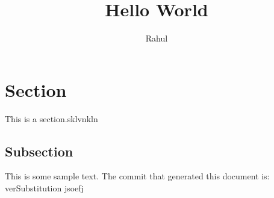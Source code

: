 \documentclass[12pt]{article}
\title{Hello World}
\author{Rahul}
\begin{document}
\maketitle

\section{Section}

This is a section.sklvnkln

\subsection{Subsection}

This is some sample text.
The commit that generated this document is: verSubstitution
jsoefj
\end{document}
